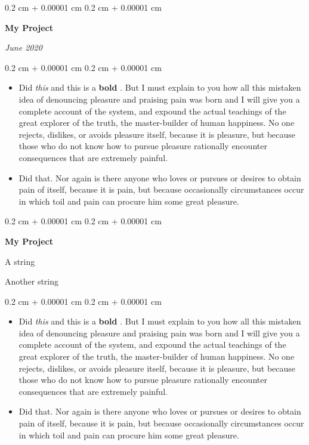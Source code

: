 \documentclass[10pt, letterpaper]{article}
\newenvironment{summary}{
    \begin{description}[
        topsep=0.10 cm,
        parsep=0.10 cm,
        partopsep=0pt,
        itemsep=0pt,
        leftmargin=0.4 cm + 10pt
    ]
}{
    \end{description}
} %
\newenvironment{highlights}{
    \begin{itemize}[
        topsep=0.10 cm,
        parsep=0.10 cm,
        partopsep=0pt,
        itemsep=0pt,
        leftmargin=0.4 cm + 10pt
    ]
}{
    \end{itemize}
} %
\newenvironment{onecolentry}{
    \begin{adjustwidth}{
        0.2 cm + 0.00001 cm
    }{
        0.2 cm + 0.00001 cm
    }
}{
    \end{adjustwidth}
} %
\newenvironment{twocolentry}[2][]{
    \onecolentry
    \def\secondColumn{#2}
    \setcolumnwidth{\fill, 4.5 cm}
    \begin{paracol}{2}
}{
    \switchcolumn \raggedleft \secondColumn
    \end{paracol}
    \endonecolentry
} %
\let\hrefWithoutArrow\href
\renewcommand{\href}[2]{\hrefWithoutArrow{#1}{\ifthenelse{\equal{#2}{}}{ }{#2 }\raisebox{.15ex}{\footnotesize \faExternalLink*}}}
\begin{document}
        \begin{twocolentry}{
            
            
        \textit{June 2020}}
            \textbf{My Project}
        \end{twocolentry}
        \vspace{0.10 cm}
        \begin{onecolentry}
            \begin{highlights}
                \item Did \textit{this} and this is a \textbf{bold} \href{https://example.com}{link}. But I must explain to you how all this mistaken idea of denouncing pleasure and praising pain was born and I will give you a complete account of the system, and expound the actual teachings of the great explorer of the truth, the master-builder of human happiness. No one rejects, dislikes, or avoids pleasure itself, because it is pleasure, but because those who do not know how to pursue pleasure rationally encounter consequences that are extremely painful.
                \item Did that. Nor again is there anyone who loves or pursues or desires to obtain pain of itself, because it is pain, but because occasionally circumstances occur in which toil and pain can procure him some great pleasure.
            \end{highlights}
        \end{onecolentry}


        \vspace{0.2 cm}

        \begin{onecolentry}
            \textbf{My Project}
        \end{onecolentry}
            \begin{summary}
                \item A string
                \item Another string
            \end{summary}
        \vspace{0.10 cm}
        \begin{onecolentry}
            \begin{highlights}
                \item Did \textit{this} and this is a \textbf{bold} \href{https://example.com}{link}. But I must explain to you how all this mistaken idea of denouncing pleasure and praising pain was born and I will give you a complete account of the system, and expound the actual teachings of the great explorer of the truth, the master-builder of human happiness. No one rejects, dislikes, or avoids pleasure itself, because it is pleasure, but because those who do not know how to pursue pleasure rationally encounter consequences that are extremely painful.
                \item Did that. Nor again is there anyone who loves or pursues or desires to obtain pain of itself, because it is pain, but because occasionally circumstances occur in which toil and pain can procure him some great pleasure.
            \end{highlights}
        \end{onecolentry}
\end{document}
